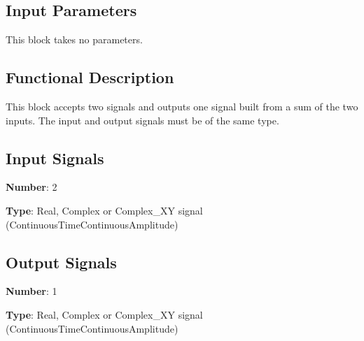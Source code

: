 \documentclass[../../sdf/tex/BPSK_system.tex]{subfiles}
\date{}
\begin{document}
\onlyinsubfile{\maketitle}

\subsection*{Input Parameters}

This block takes no parameters.

\subsection*{Functional Description}

This block accepts two signals and outputs one signal built from a sum of the two inputs. The input and output signals must be of the same type.

\subsection*{Input Signals}

\textbf{Number}: 2

\textbf{Type}: Real, Complex or Complex\_XY signal (ContinuousTimeContinuousAmplitude)

\subsection*{Output Signals}

\textbf{Number}: 1

\textbf{Type}: Real, Complex or Complex\_XY signal (ContinuousTimeContinuousAmplitude)
\end{document}

